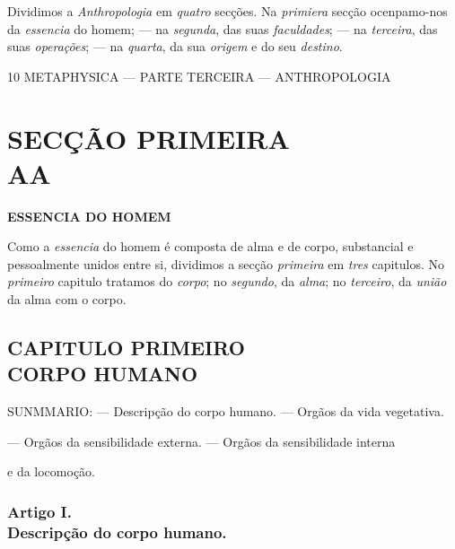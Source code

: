 
 
Dividimos a \emph{Anthropologia} em \emph{quatro} secções. Na \emph{primiera} secção ocenpamo-nos da \emph{essencia} do homem; --- na \emph{segunda}, das suas \emph{faculdades}; --- na \emph{terceira}, das suas \emph{operações}; --- na \emph{quarta}, da sua \emph{origem} e do seu \emph{destino}.

10 METAPHYSICA --- PARTE TERCEIRA --- ANTHROPOLOGIA

\part*{SECÇÃO PRIMEIRA\\[0.3em]\large AA}

 \textbf{ESSENCIA DO HOMEM}


Como a \emph{essencia} do homem é composta de alma e de corpo, substancial e pessoalmente unidos entre si, dividimos a secção \emph{primeira} em \emph{tres} capitulos. No \emph{primeiro} capitulo tratamos do \emph{corpo}; no \emph{segundo}, da \emph{alma}; no \emph{terceiro}, da \emph{união} da alma com o corpo.


\chapter*{CAPITULO PRIMEIRO\\[0.3em]\large CORPO HUMANO}

\textsc{SUNMMARIO}: --- Descripção do corpo humano. --- Orgãos da vida vegetativa.

--- Orgãos da sensibilidade externa. --- Orgãos da sensibilidade interna

e da locomoção.


\section*{Artigo I.\\ Descripção do corpo humano.}


